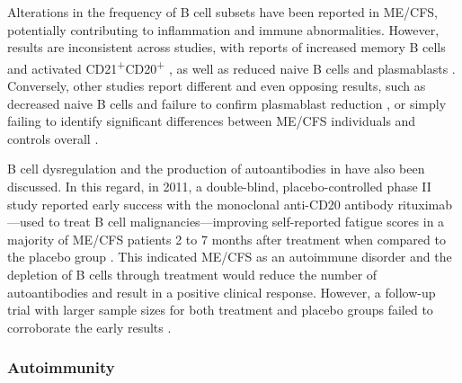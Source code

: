 Alterations in the frequency of B cell subsets have been reported in ME/CFS, potentially contributing to inflammation and immune abnormalities.
However, results are inconsistent across studies, with reports of increased memory B cells \citep{brenu2014RoleAdaptive} and activated CD21\textsuperscript{+}CD20\textsuperscript{+} \citep{klimas1990ImmunologicAbnormalitiesa}, as well as reduced naive B cells and plasmablasts \citep{bradley2013AlteredFunctional}.
Conversely, other studies report different and even opposing results, such as decreased naive B cells and failure to confirm plasmablast reduction \citep{brenu2014RoleAdaptive, ono2017DysregulationCells}, or simply failing to identify significant differences between ME/CFS individuals and controls overall \citep{curriu2013ScreeningNK, bradley2013AlteredFunctional, mensah2016ExtendedCell}.

B cell dysregulation and the production of autoantibodies in \cfs have also been discussed.
In this regard, in 2011, a double-blind, placebo-controlled phase II study reported early success with the monoclonal anti-CD20 antibody rituximab---used to treat B cell malignancies---improving self-reported fatigue scores in a majority of ME/CFS patients 2 to 7 months after treatment when compared to the placebo group \citep{fluge2011BenefitBlymphocyte}.
This indicated ME/CFS as an autoimmune disorder and the depletion of B cells through treatment would reduce the number of autoantibodies and result in a positive clinical response.
However, a follow-up trial with larger sample sizes for both treatment and placebo groups failed to corroborate the early results \citep{flugeBLymphocyteDepletionPatients2019, rowe2019MyalgicEncephalomyelitis}.


\subsubsection{Autoimmunity}

